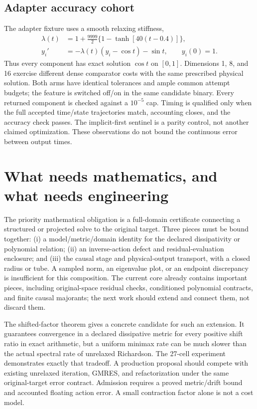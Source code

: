 \documentclass[aps,prd,reprint,amsmath,amssymb,longbibliography,nofootinbib]{revtex4-2}
\begin{document}
\subsection{Adapter accuracy cohort}
The adapter fixture uses a smooth relaxing stiffness,
\begin{align}
\lambda(t)&=1+\frac{9999}{2}\{1-\tanh[40(t-0.4)]\},\\
y_i'&=-\lambda(t)(y_i-\cos t)-\sin t,\qquad y_i(0)=1.
\end{align}
Thus every component has exact solution $\cos t$ on $[0,1]$. Dimensions 1, 8, and 16 exercise different dense comparator costs with the same prescribed physical solution. Both arms have identical tolerances and ample common attempt budgets; the feature is switched off/on in the same candidate binary. Every returned component is checked against a $10^{-5}$ cap. Timing is qualified only when the full accepted time/state trajectories match, accounting closes, and the accuracy check passes. The implicit-first sentinel is a parity control, not another claimed optimization. These observations do not bound the continuous error between output times.



\section{What needs mathematics, and what needs engineering}
\label{sec:next}
The priority mathematical obligation is a full-domain certificate connecting a structured or projected solve to the original target. Three pieces must be bound together: (i) a model/metric/domain identity for the declared dissipativity or polynomial relation; (ii) an inverse-action defect and residual-evaluation enclosure; and (iii) the causal stage and physical-output transport, with a closed radius or tube. A sampled norm, an eigenvalue plot, or an endpoint discrepancy is insufficient for this composition. The current core already contains important pieces, including original-space residual checks, conditioned polynomial contracts, and finite causal majorants; the next work should extend and connect them, not discard them.

The shifted-factor theorem gives a concrete candidate for such an extension. It guarantees convergence in a declared dissipative metric for every positive shift ratio in exact arithmetic, but a uniform minimax rate can be much slower than the actual spectral rate of unrelaxed Richardson. The 27-cell experiment demonstrates exactly that tradeoff. A production proposal should compete with existing unrelaxed iteration, GMRES, and refactorization under the same original-target error contract. Admission requires a proved metric/drift bound and accounted floating action error. A small contraction factor alone is not a cost model.
\end{document}
